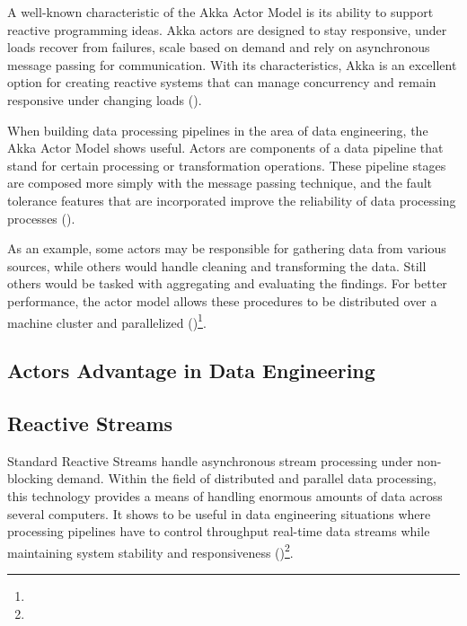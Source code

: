 A well-known characteristic of the Akka Actor Model is its ability to support reactive programming ideas. Akka actors are designed to stay responsive, under loads recover from failures, scale based on demand and rely on asynchronous message passing for communication. With its characteristics, Akka is an excellent option for creating reactive systems that can manage concurrency and remain responsive under changing loads (\cite{kuhnReactiveDesignPatterns2017})\footnotemark[33].

When building data processing pipelines in the area of data engineering, the Akka Actor Model shows useful. Actors are components of a data pipeline that stand for certain processing or transformation operations. These pipeline stages are composed more simply with the message passing technique, and the fault tolerance features that are incorporated improve the reliability of data processing processes (\cite{kuhnReactiveDesignPatterns2017})\footnotemark[33].

As an example, some actors may be responsible for gathering data from various sources, while others would handle cleaning and transforming the data. Still others would be tasked with aggregating and evaluating the findings. For better performance, the actor model allows these procedures to be distributed over a machine cluster and parallelized (\cite{kuhnReactiveDesignPatterns2017})\footnote[33]{}.





\subsection{Actors Advantage in Data Engineering}





\subsection{Reactive Streams}



Standard Reactive Streams handle asynchronous stream processing under non-blocking demand. Within the field of distributed and parallel data processing, this technology provides a means of handling enormous amounts of data across several computers. It shows to be useful in data engineering situations where processing pipelines have to control throughput real-time data streams while maintaining system stability and responsiveness (\cite{kuhnReactiveDesignPatterns2017})\footnote[33]{}.

